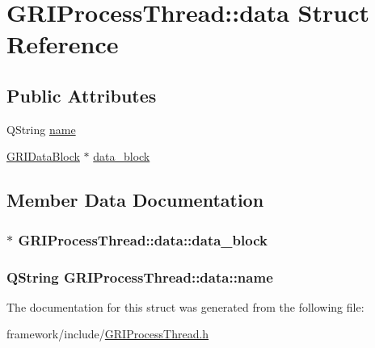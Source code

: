 \hypertarget{structGRIProcessThread_1_1data}{\section{\-G\-R\-I\-Process\-Thread\-:\-:data \-Struct \-Reference}
\label{structGRIProcessThread_1_1data}
}
\subsection*{\-Public \-Attributes}
\begin{DoxyCompactItemize}
\item 
\-Q\-String \hyperlink{structGRIProcessThread_1_1data_ad30e08b9c87f8652e9b829f58976e77a}{name}
\item 
\hyperlink{classGRIDataBlock}{\-G\-R\-I\-Data\-Block} $\ast$ \hyperlink{structGRIProcessThread_1_1data_a434eccad1244f14abf13e62559b026ea}{data\-\_\-block}
\end{DoxyCompactItemize}


\subsection{\-Member \-Data \-Documentation}
\hypertarget{structGRIProcessThread_1_1data_a434eccad1244f14abf13e62559b026ea}{
\subsubsection[{data\-\_\-block}]{$\ast$ {\bf \-G\-R\-I\-Process\-Thread\-::data\-::data\-\_\-block}}}\label{structGRIProcessThread_1_1data_a434eccad1244f14abf13e62559b026ea}
\hypertarget{structGRIProcessThread_1_1data_ad30e08b9c87f8652e9b829f58976e77a}{
\subsubsection[{name}]{\setlength{\rightskip}{0pt plus 5cm}\-Q\-String {\bf \-G\-R\-I\-Process\-Thread\-::data\-::name}}}\label{structGRIProcessThread_1_1data_ad30e08b9c87f8652e9b829f58976e77a}


\-The documentation for this struct was generated from the following file\-:\begin{DoxyCompactItemize}
\item 
framework/include/\hyperlink{GRIProcessThread_8h}{\-G\-R\-I\-Process\-Thread.\-h}\end{DoxyCompactItemize}
